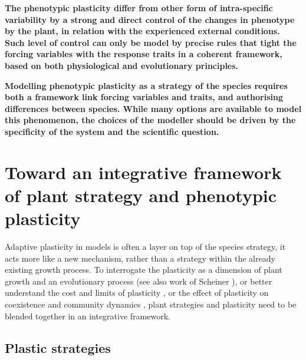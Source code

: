 \textbf{The phenotypic plasticity differ from other form of intra-specific variability by a strong and direct control of the changes in phenotype by the plant, in relation with the experienced external conditions. Such level of control can only be model by precise rules that tight the forcing variables with the response traits in a coherent framework, based on both physiological and evolutionary principles.}

\textbf{ Modelling phenotypic plasticity as a strategy of the species requires both a framework link forcing variables and traits, and authorising differences between species. While many options are available to model this phenomenon, the choices of the modeller should be driven by the specificity of the system and the scientific question.}
\section{Toward an integrative framework of plant strategy and phenotypic plasticity}

Adaptive plasticity in models is often a layer on top of the species strategy, it acts more like a new mechanism, rather than a strategy within the already existing growth process. To interrogate the plasticity as a dimension of plant growth and an evolutionary process \parencite{bradshaw_evolutionary_1965} (see also work of Scheiner \parencite{scheiner_genetics_1989, scheiner_genetics_2002 ,scheiner_genetics_2012}), or better understand the cost and limits of plasticity \cite{dewitt_costs_1998, callahan_phenotypic_2008, auld_re-evaluating_2009}, or the effect of plasticity on coexistence and community dynamics \cite{hart_how_2016}, plant strategies and plasticity need to be blended together in an integrative framework.

\subsection{Plastic strategies}

